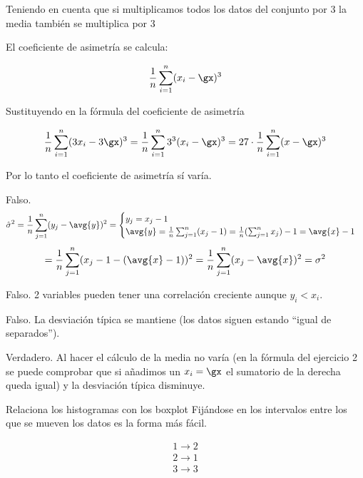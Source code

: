 \begin{problem}[5]
\spart  Teniendo en cuenta que si multiplicamos todos los datos del conjunto por $3$ la media también se multiplica por $3$

El coeficiente de asimetría se calcula:

\[\frac{1}{n} \sum_{i=1}^n (x_i-\gx)^3\]

Sustituyendo en la fórmula del coeficiente de asimetría

\[\frac{1}{n} \sum_{i=1}^n (3x_i - 3\gx)^3 = \frac{1}{n} \sum_{i=1}^n 3^3 (x_i-\gx)^3 = 27 \cdot \frac{1}{n} \sum_{i=1}^n (x-\gx)^3\]

Por lo tanto el coeficiente de asimetría sí varía.

\spart Falso. \[ \hat\sigma^2 = \frac{1}{n} \sum_{j=1}^n (y_j - \avg{y})^2 = \begin{cases} y_j = x_j - 1 \\ \avg{y} = \frac{1}{n} \sum_{j=1}^n (x_j - 1) = \frac{1}{n} ( \sum_{j=1}^n x_j ) - 1 = \avg{x} - 1 \end{cases} \]
\[ = \frac{1}{n} \sum_{j=1}^n (x_j - 1 - ( \avg{x} - 1))^2 = \frac{1}{n} \sum_{j=1}^n (x_j - \avg{x})^2  = \sigma^2 \]

\spart Falso. 2 variables pueden tener una correlación creciente aunque $y_i<x_i$.

\spart Falso. La desviación típica se mantiene (los datos siguen estando ``igual de separados'').

\spart Verdadero. Al hacer el cálculo de la media no varía (en la fórmula del ejercicio 2 se puede comprobar que si añadimos un $x_i=\gx$ el sumatorio de la derecha queda igual) y la desviación típica disminuye.

\end{problem}

\begin{problem}[7]
Relaciona los histogramas con los boxplot
\solution
Fijándose en los intervalos entre los que se mueven los datos es la forma más fácil.

\[\begin{array}{cc}
1 \to 2\\
2 \to 1\\
3 \to 3
\end{array}\]

\end{problem}

